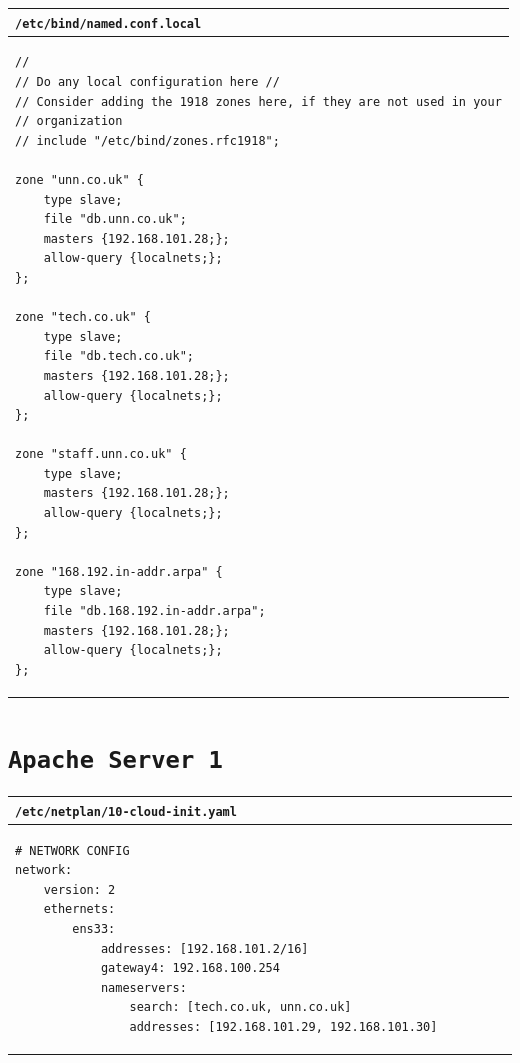 \documentclass[11pt]{article}
\begin{document}
\begin{table}[ht]
    \begin{tabular}{|p{17.7cm}|} 
        \hline
        \texttt{\textbf{/etc/bind/named.conf.local}}\\ 
        \hline
        \lstset{
                basicstyle=\scriptsize\ttfamily,
              }
              \begin{lstlisting}
// 
// Do any local configuration here //
// Consider adding the 1918 zones here, if they are not used in your
// organization
// include "/etc/bind/zones.rfc1918";
                
zone "unn.co.uk" {
    type slave;
    file "db.unn.co.uk";
    masters {192.168.101.28;};
    allow-query {localnets;};
};
                
zone "tech.co.uk" {
    type slave;
    file "db.tech.co.uk";
    masters {192.168.101.28;};
    allow-query {localnets;};
};
                
zone "staff.unn.co.uk" {
    type slave;
    masters {192.168.101.28;};
    allow-query {localnets;};
};
                
zone "168.192.in-addr.arpa" {
    type slave;
    file "db.168.192.in-addr.arpa";
    masters {192.168.101.28;};
    allow-query {localnets;};
};

        \end{lstlisting}\\
        \hline
    \end{tabular}
\end{table}

\clearpage

\section{\texttt{Apache Server 1}}
\begin{table}[ht]
    \begin{tabular}{|p{17.7cm}|} 
        \hline
        \texttt{\textbf{/etc/netplan/10-cloud-init.yaml}}\\ 
        \hline
        \lstset{
                basicstyle=\scriptsize\ttfamily,
              }
              \begin{lstlisting}
# NETWORK CONFIG
network:
    version: 2
    ethernets:
        ens33:
            addresses: [192.168.101.2/16]
            gateway4: 192.168.100.254
            nameservers:
                search: [tech.co.uk, unn.co.uk]
                addresses: [192.168.101.29, 192.168.101.30]                
        \end{lstlisting}\\
        \hline
    \end{tabular}
\end{table}
\end{document}

